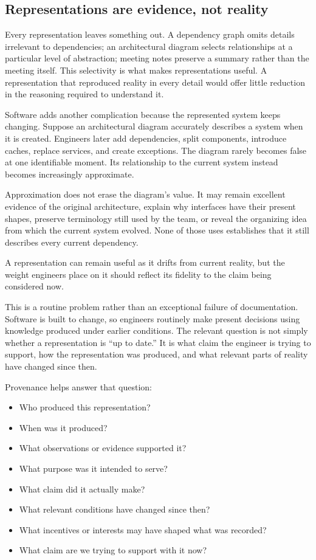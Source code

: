 \subsection{Representations are evidence, not reality}\label{sec-representations-evidence}

Every representation leaves something out. A dependency graph omits details irrelevant to
dependencies; an architectural diagram selects relationships at a particular level of abstraction;
meeting notes preserve a summary rather than the meeting itself. This selectivity is what makes
representations useful. A representation that reproduced reality in every detail would offer little
reduction in the reasoning required to understand it.

Software adds another complication because the represented system keeps changing. Suppose an
architectural diagram accurately describes a system when it is created. Engineers later add
dependencies, split components, introduce caches, replace services, and create exceptions. The
diagram rarely becomes false at one identifiable moment. Its relationship to the current system
instead becomes increasingly approximate.

Approximation does not erase the diagram's value. It may remain excellent evidence of the original
architecture, explain why interfaces have their present shapes, preserve terminology still used by
the team, or reveal the organizing idea from which the current system evolved. None of those uses
establishes that it still describes every current dependency.

A representation can remain useful as it drifts from current reality, but the weight engineers
place on it should reflect its fidelity to the claim being considered now.

This is a routine problem rather than an exceptional failure of documentation. Software is built to
change, so engineers routinely make present decisions using knowledge produced under earlier
conditions. The relevant question is not simply whether a representation is ``up to date.'' It is what
claim the engineer is trying to support, how the representation was produced, and what relevant
parts of reality have changed since then.

Provenance helps answer that question:

\begin{itemize}
\tightlist
\item
  Who produced this representation?
\item
  When was it produced?
\item
  What observations or evidence supported it?
\item
  What purpose was it intended to serve?
\item
  What claim did it actually make?
\item
  What relevant conditions have changed since then?
\item
  What incentives or interests may have shaped what was recorded?
\item
  What claim are we trying to support with it now?
\end{itemize}

